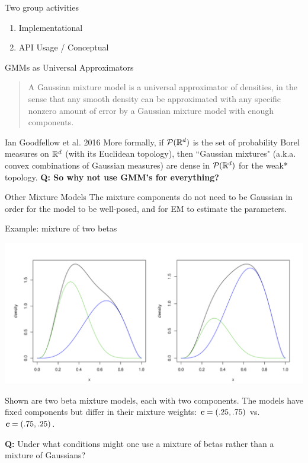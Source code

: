 \documentclass[10pt]{beamer}
\begin{document}
\begin{frame}{Two group activities}
\begin{enumerate}
\item Implementational
\item API Usage / Conceptual
\end{enumerate}

\end{frame}


\begin{frame}{GMMs as Universal Approximators}

\begin{quote}
A Gaussian mixture model is a universal approximator of densities, in the sense that any smooth density can be approximated with any speciﬁc nonzero amount of error by a Gaussian mixture model with enough components.
\end{quote}

\hfill \tiny Ian Goodfellow et al. 2016
\vfill
\tiny More formally, if $\mathcal{P}(\mathbb{R}^d)$  is the set of probability Borel measures on $\mathbb{R}^d$ (with its Euclidean topology), then ``Gaussian mixtures" (a.k.a. convex combinations of Gaussian measures) are dense in $\mathcal{P}(\mathbb{R}^d)$ for the  weak*  topology.
\vfill \vfill \vfill
\tiny \bf{Q:} So why not use GMM's for everything?

\end{frame}

\begin{frame}{Other Mixture Models}
The mixture components do not need to be Gaussian in order for the model to be well-posed, and for EM to estimate the parameters.   \\
\vfill 
\begin{sblock}{Example: mixture of two betas}
\begin{center}
\includegraphics[width=.6\textwidth]{images/mixture_of_betas}

\end{center}
\scriptsize Shown are two beta mixture models, each with two components.  The models have fixed components but differ in their mixture weights: ${\boldsymbol c} = (.25, .75)$ vs. ${\boldsymbol c} = (.75, .25)$.
\end{sblock}

\vfill \vfill \vfill
\tiny \textbf{Q:} Under what conditions might one use a mixture of betas rather than a mixture of Gaussians?
\end{frame}
\end{document}

